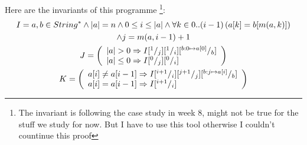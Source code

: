 \documentclass[a4paper,12pt,fleqn]{scrartcl}
\newcommand{\length}[1]{\left|#1\right|}
\begin{document}
Here are the invariants of this programme
\footnote{The invariant is following the case study in week 8, might not be true for the
 stuff we study for now. But I have to use this tool otherwise I couldn't countinue 
 this proof}:
\begin{gather*}
    I = a,b\in String^*\And\length{a} = n \And 
    0 \leq i \leq \length{a} \And \All{k \in 0..(i-1)}{ a[k] = b[m(a,k)]}\\
    \And j = m(a,i-1)+1\\
    J = 
    \left(\begin{array}[c]{l}
        \length{a}>0 \Implies I \subst{1}{j} \subst{1}{i} \subst{b:0 \mapsto a[0]}{b}\\
        \length{a}\leq 0 \Implies I \subst{0}{j} \subst{0}{i}
    \end{array}\right)\\
    K = 
    \left(\begin{array}[c]{l}
        a[i] \neq a[i-1] \Implies I \subst{i+1}{i} \subst{j+1}{j} \subst{b:j\mapsto a[i]}{b}\\
        a[i] =    a[i-1] \Implies I \subst{i+1}{i}
    \end{array}\right)
\end{gather*}
\end{document}
